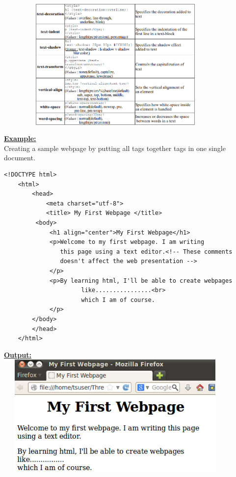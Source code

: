 \documentclass[11pt,a4paper]{article}
\begin{document}
\includegraphics[height = 65mm, width = 120mm]{Second.png}

\underline{\textbf{Example:}}\\

\hspace{1cm}Creating a sample webpage by putting all tags together tags in one single document.
\begin{verbatim}
<!DOCTYPE html>
    <html>
        <head>
            <meta charset="utf-8">
            <title> My First Webpage </title>
         <body>
             <h1 align="center">My First Webpage</h1>
             <p>Welcome to my first webpage. I am writing
                this page using a text editor.<!-- These comments
                doesn't affect the web presentation -->
             </p>
             <p>By learning html, I'll be able to create webpages
                      like................<br>
                      which I am of course.
             </p>
        </body>
        </head>
    </html>
\end{verbatim}

\underline{\textbf{Output:}}\\

\includegraphics[height = 61mm, width = 120mm]{Three.png}
\end{document}
